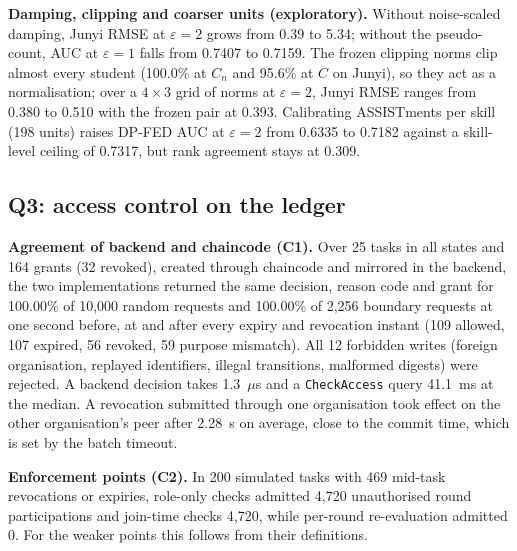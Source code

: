 \documentclass[pdflatex,iicol,sn-mathphys-num]{sn-jnl}
\theoremstyle{thmstyleone}
\newcommand{\AblJunyiFullOneAuc}{0.7407}
\newcommand{\AblJunyiFullTwoRmse}{0.39}
\newcommand{\AblJunyiNoDampTwoRmse}{5.34}
\newcommand{\AblJunyiNoPseudoOneAuc}{0.7159}
\newcommand{\AssistDPFEDTwoAuc}{0.6335}
\newcommand{\COneAgree}{100.00}
\newcommand{\COneBndAgree}{100.00}
\newcommand{\COneBndAllow}{109}
\newcommand{\COneBndExpired}{107}
\newcommand{\COneBndN}{2,256}
\newcommand{\COneBndPurpose}{59}
\newcommand{\COneBndRevoked}{56}
\newcommand{\COneChainSingleMs}{41.1}
\newcommand{\COneGrants}{164}
\newcommand{\COneN}{10,000}
\newcommand{\COneNegN}{12}
\newcommand{\COnePdpUs}{1.3}
\newcommand{\COneRevoked}{32}
\newcommand{\COneTasks}{25}
\newcommand{\CTwoEvents}{469}
\newcommand{\CTwoTasks}{200}
\newcommand{\CTwoViolJoin}{4,720}
\newcommand{\CTwoViolLogin}{4,720}
\newcommand{\CTwoViolRound}{0}
\newcommand{\FJunyiClipCntFourPct}{100.0}
\newcommand{\FJunyiGradClipHalfPct}{95.6}
\newcommand{\FJunyiSensFrozenRmse}{0.393}
\newcommand{\FJunyiSensRmseMax}{0.510}
\newcommand{\FJunyiSensRmseMin}{0.380}
\newcommand{\HCenAuc}{0.7317}
\newcommand{\HDpTwoAuc}{0.7182}
\newcommand{\HDpTwoRho}{0.309}
\newcommand{\HSkills}{198}
\newcommand{\RevokeMean}{2.28}
\begin{document}
\textbf{Damping, clipping and coarser units (exploratory).} Without noise-scaled damping, Junyi RMSE at $\varepsilon=2$ grows from \AblJunyiFullTwoRmse{} to \AblJunyiNoDampTwoRmse{}; without the pseudo-count, AUC at $\varepsilon=1$ falls from \AblJunyiFullOneAuc{} to \AblJunyiNoPseudoOneAuc{}. The frozen clipping norms clip almost every student (\FJunyiClipCntFourPct\% at $C_n$ and \FJunyiGradClipHalfPct\% at $C$ on Junyi), so they act as a normalisation; over a $4\times3$ grid of norms at $\varepsilon=2$, Junyi RMSE ranges from \FJunyiSensRmseMin{} to \FJunyiSensRmseMax{} with the frozen pair at \FJunyiSensFrozenRmse{}. Calibrating ASSISTments per skill (\HSkills{} units) raises DP-FED AUC at $\varepsilon=2$ from \AssistDPFEDTwoAuc{} to \HDpTwoAuc{} against a skill-level ceiling of \HCenAuc{}, but rank agreement stays at \HDpTwoRho{}.

\subsection{Q3: access control on the ledger}\label{sec:eval-access}

\textbf{Agreement of backend and chaincode (C1).} Over \COneTasks{} tasks in all states and \COneGrants{} grants (\COneRevoked{} revoked), created through chaincode and mirrored in the backend, the two implementations returned the same decision, reason code and grant for \COneAgree\% of \COneN{} random requests and \COneBndAgree\% of \COneBndN{} boundary requests at one second before, at and after every expiry and revocation instant (\COneBndAllow{} allowed, \COneBndExpired{} expired, \COneBndRevoked{} revoked, \COneBndPurpose{} purpose mismatch). All \COneNegN{} forbidden writes (foreign organisation, replayed identifiers, illegal transitions, malformed digests) were rejected. A backend decision takes \COnePdpUs{}~$\mu$s and a \texttt{CheckAccess} query \COneChainSingleMs{}~ms at the median. A revocation submitted through one organisation took effect on the other organisation's peer after \RevokeMean{}~s on average, close to the commit time, which is set by the batch timeout.

\textbf{Enforcement points (C2).} In \CTwoTasks{} simulated tasks with \CTwoEvents{} mid-task revocations or expiries, role-only checks admitted \CTwoViolLogin{} unauthorised round participations and join-time checks \CTwoViolJoin{}, while per-round re-evaluation admitted \CTwoViolRound{}. For the weaker points this follows from their definitions.
\end{document}
